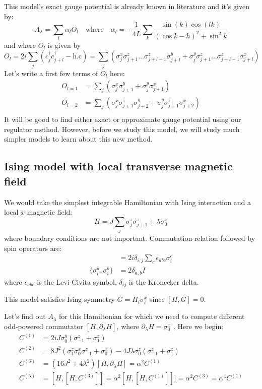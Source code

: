 \documentclass[11pt,a4paper]{article}
\begin{document}
This model's exact gauge potential is already known in literature \cite{del2012assisted, kolodrubetz2016geometry} and it's given by:
\begin{equation}
A_{\lambda}= \sum_l \alpha_l O_l \quad \mbox{where} \quad \alpha_l= -\dfrac{1}{4 L} \sum_k \dfrac{\sin(k) \cos(lk)}{(\cos k - h)^2 + \sin^2 k}
\end{equation}
and where  $O_l$ is given by
\begin{equation}
O_l= 2 i \sum_j (c^{\dagger}_{j} c^{\dagger}_{j+l} - \mbox{h.c})= \sum_j ( \sigma_j^x \sigma_{j+1}^z \ldots \sigma_{j+l-1}^z \sigma_{j+l}^y +  \sigma_j^y \sigma_{j+1}^z \ldots \sigma_{j+l-1}^z \sigma_{j+l}^x)
\end{equation}
Let's write a first few terms of $O_l$ here:
\begin{align*}
O_{l=1}&=  \sum_j ( \sigma_j^x  \sigma_{j+1}^y +  \sigma_j^y  \sigma_{j+1}^x) \\
O_{l=2} &=  \sum_j ( \sigma_j^x \sigma_{j+1}^z \sigma_{j+2}^y +  \sigma_j^y \sigma_{j+1}^z \sigma_{j+2}^x) \\
\end{align*}
It will be good to find either exact or approximate gauge potential using our regulator method. However, before we study this model, we will study much simpler models to learn about this new method.


\subsection{Ising model with local transverse magnetic field}
We would take the simplest integrable Hamiltonian with Ising interaction and a local $x$ magnetic field:
\begin{equation}
H= J \sum_{j}  \sigma_j^z \sigma_{j+1}^z +  \lambda  \sigma_0^x
\label{zz}
\end{equation}
where boundary conditions are not important. Commutation relation followed by spin operators are:
\begin{align}
[\sigma_i^a, \sigma_{j}^b]&= 2 i   \delta_{i,j} \sum_c  \epsilon_{a b c} \sigma_i^c
\\
\{\sigma_i^a, \sigma_{i}^b\}&= 2   \delta_{a,b} I
\end{align}
where $\epsilon_{abc}$ is the Levi-Civita symbol, $ \delta_{ij}$ is the Kronecker delta.

This model satisfies Ising symmetry $G= \Pi_i \sigma_i^x$ since $[H, G]=0$.


Let's find out $A_{\lambda}$ for this Hamiltonian for which we need to compute different odd-powered commutator $[H, \partial_{\lambda} H]$, where $\partial_{\lambda} H=\sigma_0^x$ . Here we begin:
\begin{align}
C^{(1)}&= 2 i J \sigma_0^y ( \sigma_{-1}^z + \sigma_1^z) \\ 
C^{(2)}&= 8 J^2(\sigma^z_1 \sigma^x_0 \sigma^z_{-1} + \sigma^x_0) - 4J \lambda \sigma_0^z( \sigma_{-1}^z + \sigma_1^z) \\
C^{(3)} &=  (16 J^2 + 4 \lambda ^2) [H, \partial_{\lambda} H] = \alpha^2  C^{(1)} \\
C^{(5)}&=[H,[H, C^{(3)}]]  = \alpha^2 [H, [H,C^{(1)}]]]=\alpha^2 C^{(3)}=  \alpha^4 C^{(1)}   
\end{align}
\end{document}
